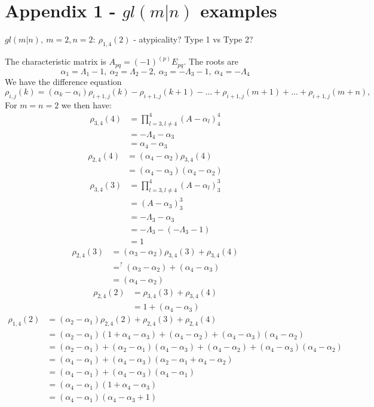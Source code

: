 \documentclass[12pt]{article}
\begin{document}
\section*{Appendix 1 - $gl(m|n)$ examples}
\begin{center}
{\large\bf $gl(m|n),~m=2,n=2:~\rho_{1,4}(2)$} - atypicality? Type 1 vs Type 2?
\end{center}
The characteristic matrix is $A_{pq} = (-1)^{(p)} E_{pq}$.
The roots are
$$
\alpha_1 = \Lambda_1 - 1,~ \alpha_2 = \Lambda_2 - 2,~ \alpha_3 = -\Lambda_3 - 1,~\alpha_4 = -\Lambda_4 
$$
We have the difference equation
$$
\rho_{i,j}(k) = (\alpha_k - \alpha_i) \rho_{i+1,j}(k) - \rho_{i+1,j}(k+1) - ... + \rho_{i+1,j}(m+1) + ... + \rho_{i+1,j}(m+n),
$$
For $m=n=2$ we then have:
\begin{align*}
\rho_{3,4}(4) &= \prod_{l=3,l \neq 4}^4(A - \alpha_l)^4_4 \\
&= -\Lambda_4 - \alpha_3 \\
&= \alpha_4 - \alpha_3 
\end{align*}
\begin{align*}
\rho_{2,4}(4) &= (\alpha_4 - \alpha_2) \rho_{3,4}(4) \\
&= (\alpha_4 - \alpha_3)(\alpha_4 - \alpha_2)
\end{align*}
\begin{align*}
\rho_{3,4}(3) &=  \prod_{l=3,l \neq 4}^4(A - \alpha_l)^3_3\\
&=  (A - \alpha_3)^3_3 \\
&= -\Lambda_3 - \alpha_3 \\
&= -\Lambda_3 - (-\Lambda_3 - 1) \\
&= 1
\end{align*}
\begin{align*}
\rho_{2,4}(3) &= (\alpha_3 - \alpha_2) \rho_{3,4}(3) + \rho_{3,4}(4) \\
&=^? (\alpha_3 - \alpha_2) + (\alpha_4 - \alpha_3) \\
&= (\alpha_4 - \alpha_2)
\end{align*}
\begin{align*}
\rho_{2,4}(2) &=  \rho_{3,4}(3) + \rho_{3,4}(4)\\
&= 1 + (\alpha_4 - \alpha_3)
\end{align*}
\begin{align*}
\rho_{1,4}(2) &= (\alpha_2 - \alpha_1) \rho_{2,4}(2) + \rho_{2,4}(3) + \rho_{2,4}(4) \\
&= (\alpha_2 - \alpha_1) (1 + \alpha_4 - \alpha_3) + (\alpha_4 - \alpha_2) + (\alpha_4 - \alpha_3)(\alpha_4 - \alpha_2) \\
&= (\alpha_2 - \alpha_1)  + (\alpha_2 - \alpha_1) (\alpha_4 - \alpha_3)  + (\alpha_4 - \alpha_2) + (\alpha_4 - \alpha_3)(\alpha_4 - \alpha_2) \\
&= (\alpha_4 - \alpha_1)  + (\alpha_4 - \alpha_3)( \alpha_2 - \alpha_1 + \alpha_4 - \alpha_2 ) \\
&= (\alpha_4 - \alpha_1)  + (\alpha_4 - \alpha_3)(\alpha_4 - \alpha_1  ) \\
&= (\alpha_4 - \alpha_1) ( 1 + \alpha_4 - \alpha_3) \\
&= (\alpha_4 - \alpha_1) ( \alpha_4 - \alpha_3 + 1)
\end{align*}
\end{document}
